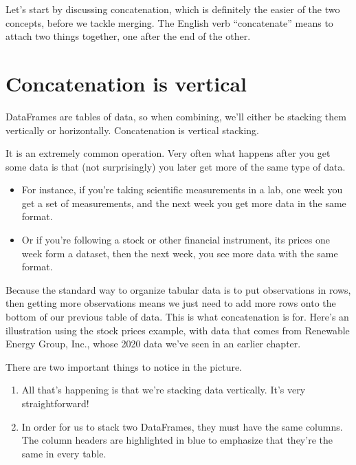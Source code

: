 \documentclass[letterpaper,10pt,english]{jupyterBook}
\begin{document}
\sphinxAtStartPar
Let’s start by discussing concatenation, which is definitely the easier of the two concepts, before we tackle merging.  The English verb “concatenate” means to attach two things together, one after the end of the other.


\section{Concatenation is vertical}
\label{\detokenize{chapter-12-concat-and-merge:concatenation-is-vertical}}
\sphinxAtStartPar
DataFrames are tables of data, so when combining, we’ll either be stacking them vertically or horizontally.  Concatenation is vertical stacking.

\sphinxAtStartPar
It is an extremely common operation.  Very often what happens after you get some data is that (not surprisingly) you later get more of the same type of data.
\begin{itemize}
\item {} 
\sphinxAtStartPar
For instance, if you’re taking scientific measurements in a lab, one week you get a set of measurements, and the next week you get more data in the same format.

\item {} 
\sphinxAtStartPar
Or if you’re following a stock or other financial instrument, its prices one week form a dataset, then the next week, you see more data with the same format.

\end{itemize}

\sphinxAtStartPar
Because the standard way to organize tabular data is to put observations in rows, then getting more observations means we just need to add more rows onto the bottom of our previous table of data.  This is what concatenation is for.  Here’s an illustration using the stock prices example, with data that comes from Renewable Energy Group, Inc., whose 2020 data we’ve seen in an earlier chapter.

\sphinxAtStartPar
{}

\sphinxAtStartPar
There are two important things to notice in the picture.
\begin{enumerate}
%
\item {} 
\sphinxAtStartPar
All that’s happening is that we’re stacking data vertically.  It’s very straightforward!

\item {} 
\sphinxAtStartPar
In order for us to stack two DataFrames, they must have the same columns.  The column headers are highlighted in blue to emphasize that they’re the same in every table.

\end{enumerate}
\end{document}
